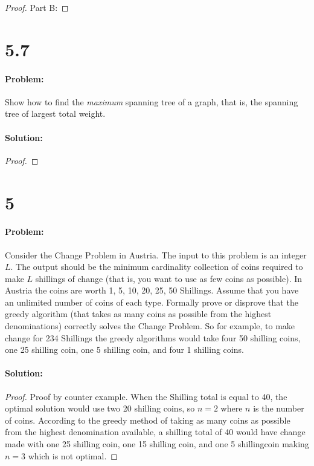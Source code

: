 \documentclass[12pt]{article}
\begin{document}
\begin{proof}
Part B:
\end{proof}


\section*{5.7}
\paragraph{Problem:}
Show how to find the \emph{maximum} spanning tree of a graph, that is, the spanning tree of largest
total weight.

\paragraph{Solution:}
\begin{proof}
\end{proof}

\section*{5}
\paragraph{Problem:}
Consider the Change Problem in Austria. The input to this problem is
an integer $L$. The output should be the minimum cardinality collection
of coins required to make $L$ shillings of change (that is, you want to use
as few coins as possible). In Austria the coins are worth 1, 5, 10, 20, 25,
50 Shillings. Assume that you have an unlimited number of coins of each
type. Formally prove or disprove that the greedy algorithm (that takes as
many coins as possible from the highest denominations) correctly solves
the Change Problem. So for example, to make change for 234 Shillings the
greedy algorithms would take four 50 shilling coins, one 25 shilling coin,
one 5 shilling coin, and four 1 shilling coins.

\paragraph{Solution:}
\begin{proof}
Proof by counter example.
When the Shilling total is equal to 40, the optimal solution would use two 20 shilling coins, so $n=2$ where $n$ is the number of coins.  According to the greedy method of taking as many coins as possible from the highest denomination available, a shilling total of 40 would have change made with one 25 shilling coin, one 15 shilling coin, and one 5 shillingcoin making $n=3$ which is not optimal.
\end{proof}
\end{document}
